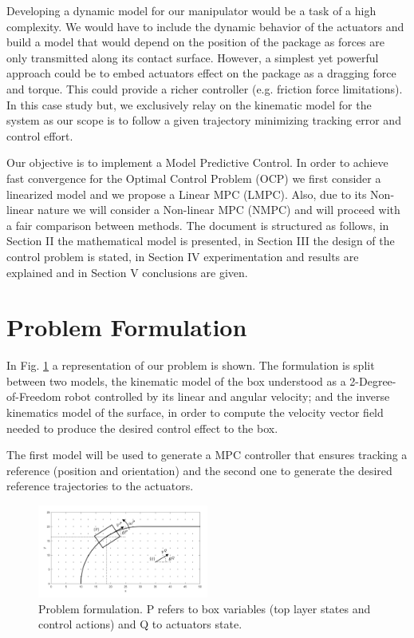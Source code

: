 \documentclass[conference]{IEEEtran}
\begin{document}
Developing a dynamic model for our manipulator would be a task of a high complexity. We would have to include the dynamic behavior of the actuators and build a model that would depend on the position of the package as forces are only transmitted along its contact surface. However, a simplest yet powerful approach could be to embed actuators effect on the package as a dragging force and torque. This could provide a richer controller (e.g. friction force limitations). In this case study but, we exclusively relay on the kinematic model for the system as our scope is to follow a given trajectory minimizing tracking error and control effort.

Our objective is to implement a Model Predictive Control. In order to achieve fast convergence for the Optimal Control Problem (OCP) we first consider a linearized model and we propose a Linear MPC (LMPC). Also, due to its Non-linear nature we will consider a Non-linear MPC (NMPC) and will proceed with a fair comparison between methods. The document is structured as follows, in Section II the mathematical model is presented, in Section III the design of the control problem is stated, in Section IV experimentation and results are explained and in Section V conclusions are given.

\section{Problem Formulation}

In Fig. \ref{fig:problem} a representation of our problem is shown. The formulation is split between two models, the kinematic model of the box understood as a 2-Degree-of-Freedom robot controlled by its linear and angular velocity; and the inverse kinematics model of the surface, in order to compute the velocity vector field needed to produce the desired control effect to the box.

The first model will be used to generate a MPC controller that ensures tracking a reference (position and orientation) and the second one to generate the desired reference trajectories to the actuators.

\begin{figure}[H]
\centering
\includegraphics[width=0.5\textwidth]{problem_variables.PNG}
\caption{\label{fig:problem}Problem formulation. P refers to box variables (top layer states and control actions) and Q to actuators state.}
\end{figure}
\end{document}
